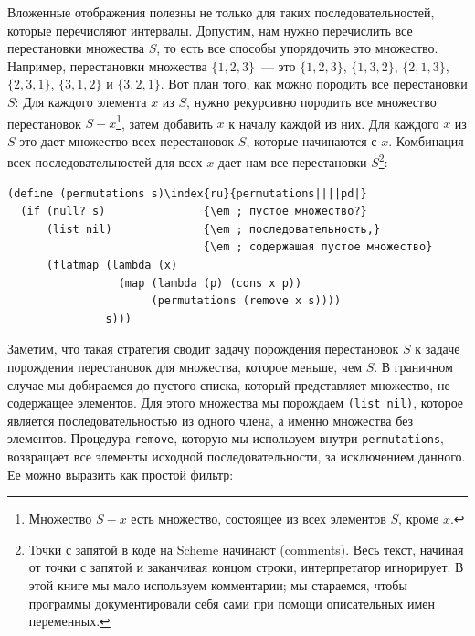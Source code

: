 Вложенные отображения полезны не только для таких
последовательностей, которые перечисляют интервалы.  Допустим, нам
нужно перечислить все 
перестановки множества $S$, то есть  
все способы упорядочить это множество.  Например, перестановки
множества $\{1, 2, 3\}$~--- это $\{1, 2, 3\}$, $\{1, 3, 
2\}$, $\{2, 1, 3\}$, $\{2, 3, 1\}$, $\{3, 1, 2\}$ и $\{3, 2,
1\}$. Вот план того, как можно породить все перестановки
$S$: Для каждого элемента $x$ из $S$,
нужно рекурсивно породить все множество перестановок $S -
x$\footnote{Множество $S - x$ есть множество,
  состоящее из всех элементов $S$, кроме $x$.},
затем добавить $x$ к началу каждой из них.  Для каждого
$x$ из $S$ это дает множество всех перестановок
$S$, которые начинаются с $x$.  Комбинация всех
последовательностей для всех $x$ дает нам все перестановки
$S$\footnote{Точки с запятой в коде на Scheme начинают 
%
%
 (comments).
Весь текст, начиная от точки 
с запятой и заканчивая концом строки, интерпретатор игнорирует.  В
этой книге мы мало используем комментарии; мы стараемся, чтобы
программы документировали себя сами при помощи описательных имен
переменных.
}:

\begin{Verbatim}[fontsize=\small]
(define (permutations s)\index{ru}{permutations||||pd|}
  (if (null? s)               {\em ; пустое множество?}
      (list nil)              {\em ; последовательность,} 
                              {\em ; содержащая пустое множество}
      (flatmap (lambda (x)
                 (map (lambda (p) (cons x p))
                      (permutations (remove x s))))
               s)))
\end{Verbatim}
Заметим, что такая стратегия сводит задачу порождения 
перестановок $S$ к задаче порождения перестановок для
множества, которое меньше, чем $S$.  В граничном случае мы
добираемся до пустого списка, который представляет множество, не
содержащее элементов.  Для этого множества мы порождаем 
{\tt (list nil)}, которое является последовательностью из
одного члена, а именно множества без элементов.  Процедура
{\tt remove}, которую мы используем внутри
{\tt permutations}, возвращает все элементы исходной
последовательности, за исключением данного.  Ее можно выразить как
простой фильтр:

